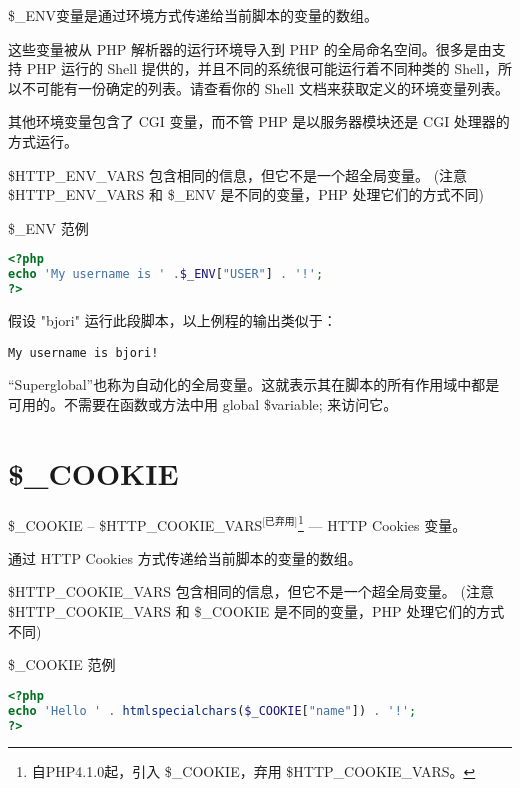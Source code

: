 \$\_ENV变量是通过环境方式传递给当前脚本的变量的数组。

这些变量被从 PHP 解析器的运行环境导入到 PHP 的全局命名空间。很多是由支持 PHP 运行的 Shell 提供的，并且不同的系统很可能运行着不同种类的 Shell，所以不可能有一份确定的列表。请查看你的 Shell 文档来获取定义的环境变量列表。

其他环境变量包含了 CGI 变量，而不管 PHP 是以服务器模块还是 CGI 处理器的方式运行。

\$HTTP\_ENV\_VARS 包含相同的信息，但它不是一个超全局变量。 (注意 \$HTTP\_ENV\_VARS 和 \$\_ENV 是不同的变量，PHP 处理它们的方式不同)





\begin{example}
\$\_ENV 范例
\begin{lstlisting}[language=PHP]
<?php
echo 'My username is ' .$_ENV["USER"] . '!';
?>
\end{lstlisting}
\end{example}

假设 "bjori" 运行此段脚本，以上例程的输出类似于：

\begin{verbatim}
My username is bjori!
\end{verbatim}


“Superglobal”也称为自动化的全局变量。这就表示其在脚本的所有作用域中都是可用的。不需要在函数或方法中用 global \$variable; 来访问它。



\section{\$\_COOKIE}

\$\_COOKIE -- \$HTTP\_COOKIE\_VARS$^{\text{[已弃用]}}$\footnote{自PHP4.1.0起，引入 \$\_COOKIE，弃用 \$HTTP\_COOKIE\_VARS。} — HTTP Cookies 变量。



通过 HTTP Cookies 方式传递给当前脚本的变量的数组。

\$HTTP\_COOKIE\_VARS 包含相同的信息，但它不是一个超全局变量。 (注意 \$HTTP\_COOKIE\_VARS 和 \$\_COOKIE 是不同的变量，PHP 处理它们的方式不同)




\begin{example}
\$\_COOKIE 范例
\begin{lstlisting}[language=PHP]
<?php
echo 'Hello ' . htmlspecialchars($_COOKIE["name"]) . '!';
?>
\end{lstlisting}
\end{example}

